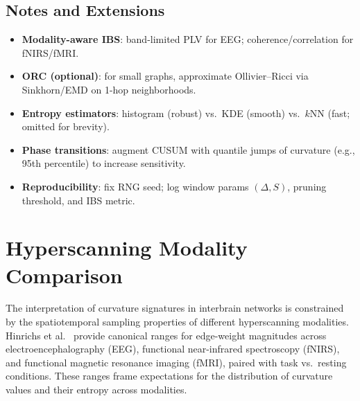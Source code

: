 \documentclass{article}
\theoremstyle{definition}
\begin{document}
\subsection{Notes and Extensions}
\begin{itemize}
  \item \textbf{Modality-aware IBS}: band-limited PLV for EEG; coherence/correlation for fNIRS/fMRI.
  \item \textbf{ORC (optional)}: for small graphs, approximate Ollivier--Ricci via Sinkhorn/EMD on 1-hop neighborhoods.
  \item \textbf{Entropy estimators}: histogram (robust) vs.\ KDE (smooth) vs.\ $k$NN (fast; omitted for brevity).
  \item \textbf{Phase transitions}: augment CUSUM with quantile jumps of curvature (e.g., 95th percentile) to increase sensitivity.
  \item \textbf{Reproducibility}: fix RNG seed; log window params $(\Delta,S)$, pruning threshold, and IBS metric.
\end{itemize}

\section{Hyperscanning Modality Comparison}
\label{sec:modality-comparison}

The interpretation of curvature signatures in interbrain networks is constrained
by the spatiotemporal sampling properties of different hyperscanning modalities.
Hinrichs et al.~\cite{hinrichs2025geometry} provide canonical ranges for
edge-weight magnitudes across electroencephalography (EEG), functional near-infrared
spectroscopy (fNIRS), and functional magnetic resonance imaging (fMRI), paired
with task vs.\ resting conditions. These ranges frame expectations for the
distribution of curvature values and their entropy across modalities.
\end{document}
